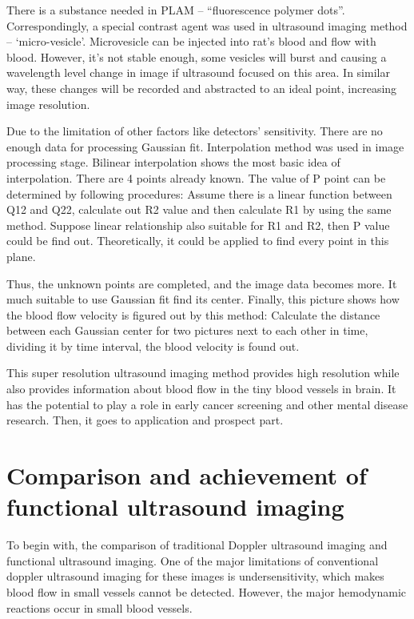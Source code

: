 \documentclass[paper=a4, fontsize=11pt]{scrartcl} %
\numberwithin{equation}{section} %
\numberwithin{figure}{section} %
\numberwithin{table}{section} %
\begin{document}
There is a substance needed in PLAM – “fluorescence polymer dots”. Correspondingly, a special contrast agent was used in ultrasound imaging method – ‘micro-vesicle’. Microvesicle can be injected into rat’s blood and flow with blood. However, it’s not stable enough, some vesicles will burst and causing a wavelength level change in image if ultrasound focused on this area. In similar way, these changes will be recorded and abstracted to an ideal point, increasing image resolution.

Due to the limitation of other factors like detectors’ sensitivity. There are no enough data for processing Gaussian fit. Interpolation method was used in image processing stage. Bilinear interpolation shows the most basic idea of interpolation. There are 4 points already known. The value of P point can be determined by following procedures: Assume there is a linear function between Q12 and Q22, calculate out R2 value and then calculate R1 by using the same method. Suppose linear relationship also suitable for R1 and R2, then P value could be find out. Theoretically, it could be applied to find every point in this plane. 

Thus, the unknown points are completed, and the image data becomes more. It much suitable to use Gaussian fit find its center.
Finally, this picture shows how the blood flow velocity is figured out by this method: Calculate the distance between each Gaussian center for two pictures next to each other in time, dividing it by time interval, the blood velocity is found out. 

This super resolution ultrasound imaging method provides high resolution while also provides information about blood flow in the tiny blood vessels in brain. It has the potential to play a role in early cancer screening and other mental disease research.
Then, it goes to application and prospect part.


\section{Comparison and achievement of functional ultrasound imaging}
To begin with, the comparison of traditional Doppler ultrasound imaging and functional ultrasound imaging. One of the major limitations of conventional doppler ultrasound imaging for these images is undersensitivity, which makes blood flow in small vessels cannot be detected. However, the major hemodynamic reactions occur in small blood vessels. 
\end{document}
